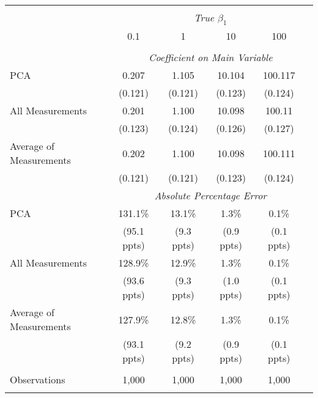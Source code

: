 \begin{table}[!htbp] \centering
\begin{tabular}{@{\extracolsep{5pt}}lccccc}
\\[-1.8ex]\hline
\hline \\[-1.8ex]
& \multicolumn{5}{c}{\textit{True $\beta_1$}} \
\cr \cline{5-6}
\\[-1.8ex] & 0.1 & 1 & 10 & 100 \\
\hline \\[-1.8ex]
& \multicolumn{5}{c}{\textit{Coefficient on Main Variable}} \\
 PCA & 0.207 & 1.105 & 10.104 & 100.117  \\
  & (0.121) & (0.121) & (0.123) & (0.124)\\
 All Measurements & 0.201 & 1.100 & 10.098 & 100.11  \\
  & (0.123) & (0.124) & (0.126) & (0.127)\\
 Average of Measurements & 0.202 & 1.100 & 10.098 & 100.111  \\
  & (0.121) & (0.121) & (0.123) & (0.124)\\
& \multicolumn{5}{c}{\textit{Absolute Percentage Error}} \\
  PCA & 131.1\% & 13.1\% & 1.3\% & 0.1\%  \\
   & (95.1 ppts) & (9.3 ppts) & (0.9 ppts) & (0.1 ppts)\\
All Measurements & 128.9\% & 12.9\% & 1.3\% & 0.1\%  \\
  & (93.6 ppts) & (9.3 ppts) & (1.0 ppts) & (0.1 ppts)\\
  Average of Measurements & 127.9\% & 12.8\% & 1.3\% & 0.1\%  \\
  & (93.1 ppts) & (9.2 ppts) & (0.9 ppts) & (0.1 ppts)\\
\hline \\[-1.8ex]
 Observations & 1,000 & 1,000 & 1,000 & 1,000 &\\
\hline
\hline \\[-1.8ex]
\end{tabular}
\end{table}